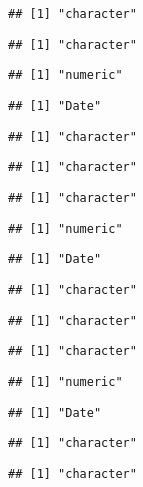 \documentclass[
]{article}
\begin{document}
\begin{verbatim}
## [1] "character"
\end{verbatim}

\begin{verbatim}
## [1] "character"
\end{verbatim}

\begin{verbatim}
## [1] "numeric"
\end{verbatim}

\begin{verbatim}
## [1] "Date"
\end{verbatim}

\begin{verbatim}
## [1] "character"
\end{verbatim}

\begin{verbatim}
## [1] "character"
\end{verbatim}

\begin{verbatim}
## [1] "character"
\end{verbatim}

\begin{verbatim}
## [1] "numeric"
\end{verbatim}

\begin{verbatim}
## [1] "Date"
\end{verbatim}

\begin{verbatim}
## [1] "character"
\end{verbatim}

\begin{verbatim}
## [1] "character"
\end{verbatim}

\begin{verbatim}
## [1] "character"
\end{verbatim}

\begin{verbatim}
## [1] "numeric"
\end{verbatim}

\begin{verbatim}
## [1] "Date"
\end{verbatim}

\begin{verbatim}
## [1] "character"
\end{verbatim}

\begin{verbatim}
## [1] "character"
\end{verbatim}
\end{document}
